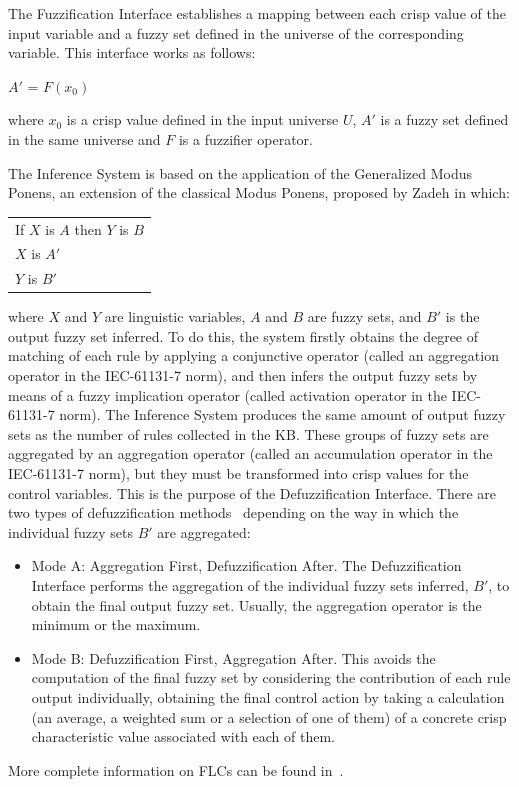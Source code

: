 \documentclass[11pt,twoside]{article}
\begin{document}
\begin{multicols}{2}
The Fuzzification Interface establishes a mapping between each crisp value of the input variable and a fuzzy set defined in the universe of the corresponding variable. This interface works as follows:

\vspace*{5pt}
$A'$ = $F(x_0)$
\vspace*{5pt}

\noindent where $x_0$ is a crisp value defined in the input universe $U$, $A'$ is a fuzzy set defined in the same universe and $F$ is a fuzzifier operator.

The Inference System is based on the application of the Generalized Modus Ponens, an extension of the classical Modus Ponens, proposed by Zadeh in which: 

\vspace*{5pt}
\begin{tabular}{l}
If $X$ is $A$ then $Y$ is $B$\\
$X$ is $A'$\\
\hline
$Y$ is $B'$\\
\end{tabular}
\vspace*{5pt}

\noindent where $X$ and $Y$ are linguistic variables, $A$ and $B$ are fuzzy sets, and $B'$ is the output fuzzy set inferred. To do this, the system firstly obtains the degree of matching of each rule by applying a conjunctive operator (called an aggregation operator in the IEC-61131-7 norm), and then infers the output fuzzy sets by means of a fuzzy implication operator (called activation operator in the IEC-61131-7 norm). The Inference System produces the same amount of output fuzzy sets as the number of rules collected in the KB. These groups of fuzzy sets are aggregated by an aggregation operator (called an accumulation operator in the IEC-61131-7 norm), but they must be transformed into crisp values for the control variables. This is the purpose of the Defuzzification Interface. There are two types of defuzzification methods~\cite{Wan94,CHP97} depending on the way in which the individual fuzzy sets $B'$ are aggregated:
\begin{itemize}
\item Mode A: Aggregation First, Defuzzification After. The Defuzzification Interface performs the aggregation of the individual fuzzy sets inferred, $B'$, to obtain the final output fuzzy set. Usually, the aggregation operator is the minimum or the maximum.
\item Mode B: Defuzzification First, Aggregation After. This avoids the computation of the final fuzzy set by considering the contribution of each rule output individually, obtaining the final control action by taking a calculation (an average, a weighted sum or a selection of one of them) of a concrete crisp characteristic value associated with each of them.
\end{itemize}
More complete information on FLCs can be found in~\cite{Lee90,DHR93,Bon94}.



\end{multicols}
\end{document}
